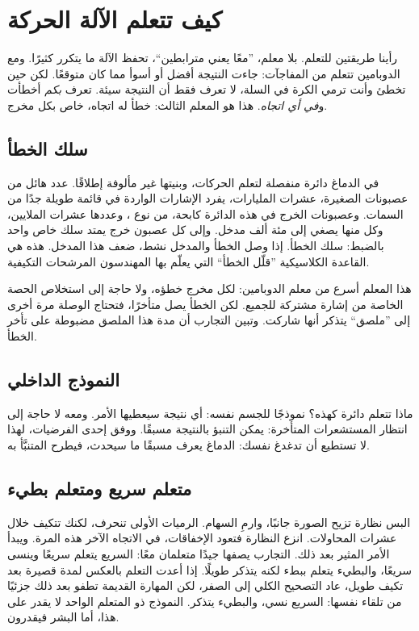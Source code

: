 \chapter{كيف تتعلم الآلة الحركة}

رأينا طريقتين للتعلم. بلا معلم، ”معًا يعني مترابطين“، تحفظ الآلة ما يتكرر كثيرًا. ومع الدوبامين تتعلم من المفاجآت: جاءت النتيجة أفضل أو أسوأ مما كان متوقعًا. لكن حين تخطئ وأنت ترمي الكرة في السلة، لا تعرف فقط أن النتيجة سيئة. تعرف \emph{بكم} أخطأت و\emph{في أي اتجاه}. هذا هو المعلم الثالث: خطأ له اتجاه، خاص بكل مخرج.

\section*{سلك الخطأ}

في الدماغ دائرة منفصلة لتعلم الحركات، وبنيتها غير مألوفة إطلاقًا. عدد هائل من عصبونات  الصغيرة، عشرات المليارات، يفرد الإشارات الواردة في قائمة طويلة جدًا من السمات. وعصبونات الخرج في هذه الدائرة كابحة، من نوع ، وعددها عشرات الملايين، وكل منها يصغي إلى مئة ألف مدخل. وإلى كل عصبون خرج يمتد سلك خاص واحد بالضبط: سلك الخطأ. إذا وصل الخطأ والمدخل نشط، ضعف هذا المدخل. هذه هي القاعدة الكلاسيكية ”قلّل الخطأ“ التي يعلّم بها المهندسون المرشحات التكيفية.


هذا المعلم أسرع من معلم الدوبامين: لكل مخرج خطؤه، ولا حاجة إلى استخلاص الحصة الخاصة من إشارة مشتركة للجميع. لكن الخطأ يصل متأخرًا، فتحتاج الوصلة مرة أخرى إلى ”ملصق“ يتذكر أنها شاركت. وتبين التجارب أن مدة هذا الملصق مضبوطة على تأخر الخطأ.

\section*{النموذج الداخلي}

ماذا تتعلم دائرة كهذه؟ نموذجًا للجسم نفسه: أي نتيجة سيعطيها الأمر. ومعه لا حاجة إلى انتظار المستشعرات المتأخرة: يمكن التنبؤ بالنتيجة مسبقًا. ووفق إحدى الفرضيات، لهذا لا تستطيع أن تدغدغ نفسك: الدماغ يعرف مسبقًا ما سيحدث، فيطرح المتنبَّأ به.

\section*{متعلم سريع ومتعلم بطيء}

البس نظارة تزيح الصورة جانبًا، وارمِ السهام. الرميات الأولى تنحرف، لكنك تتكيف خلال عشرات المحاولات. انزع النظارة فتعود الإخفاقات، في الاتجاه الآخر هذه المرة. ويبدأ الأمر المثير بعد ذلك. التجارب يصفها جيدًا متعلمان معًا: السريع يتعلم سريعًا وينسى سريعًا، والبطيء يتعلم ببطء لكنه يتذكر طويلًا. إذا أعدت التعلم بالعكس لمدة قصيرة بعد تكيف طويل، عاد التصحيح الكلي إلى الصفر، لكن المهارة القديمة تطفو بعد ذلك جزئيًا من تلقاء نفسها: السريع نسي، والبطيء يتذكر. النموذج ذو المتعلم الواحد لا يقدر على هذا، أما البشر فيقدرون.


